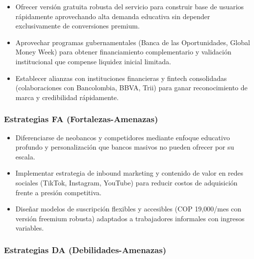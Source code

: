 \begin{itemize}
	\item Ofrecer versión gratuita robusta del servicio para construir base de usuarios rápidamente aprovechando alta demanda educativa sin depender exclusivamente de conversiones premium.
	
	\item Aprovechar programas gubernamentales (Banca de las Oportunidades, Global Money Week) para obtener financiamiento complementario y validación institucional que compense liquidez inicial limitada.
	
	\item Establecer alianzas con instituciones financieras y fintech consolidadas (colaboraciones con Bancolombia, BBVA, Trii) para ganar reconocimiento de marca y credibilidad rápidamente.
\end{itemize}

{}
\subsubsection*{Estrategias FA (Fortalezas-Amenazas)}


\begin{itemize}
	\item Diferenciarse de neobancos y competidores mediante enfoque educativo profundo y personalización que bancos masivos no pueden ofrecer por su escala.
	
	\item Implementar estrategia de inbound marketing y contenido de valor en redes sociales (TikTok, Instagram, YouTube) para reducir costos de adquisición frente a presión competitiva.
	
	\item Diseñar modelos de suscripción flexibles y accesibles (COP 19,000/mes con versión freemium robusta) adaptados a trabajadores informales con ingresos variables.
\end{itemize}

{}
\subsubsection*{Estrategias DA (Debilidades-Amenazas)}



